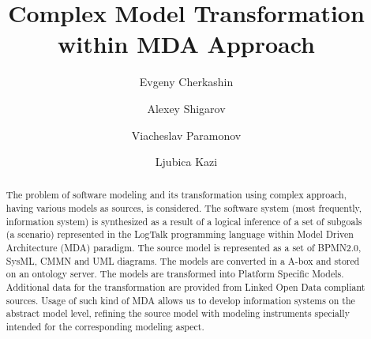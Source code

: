 \documentclass[12pt,a4paper]{llncs}
\begin{document}
\title{Complex Model Transformation within MDA Approach}


\author{Evgeny Cherkashin\and
Alexey Shigarov\and
Viacheslav Paramonov\and
Ljubica Kazi
}



\institute{%
Matrosov Institute for System Dynamics and Control Theory of SB RAS,\\ 134 Lermontov Street, Irkutsk, 664033, Russia\and
National Research Irkutsk State Technical University,\\ 83 Lermontov Street, Irkutsk, 664074, Russia\\
University of Novi Sad, Technical faculty "Mihajlo Pupin",\\ \DJ{}ure \DJ{}akovi\'ca bb, Zrenjanin, 23000, Serbia\and
\email{\{eugeneai,shig,slv\}@icc.ru, ljubica.kazi@gmail.com}}

\maketitle

\begin{abstract} %
The problem of software modeling and its transformation using complex approach, having various models as sources, is considered.  The software system (most frequently, information system) is synthesized as a result of a logical inference of a set of subgoals (a scenario) represented in the LogTalk programming language within Model Driven Architecture (MDA) paradigm.  The source model is represented as a set of BPMN2.0, SysML, CMMN and UML diagrams.  The models are converted in a A-box and stored on an ontology server.  The models are transformed into Platform Specific Models.  Additional data for the transformation are provided from Linked Open Data compliant sources.  Usage of such kind of MDA allows us to develop information systems on the abstract model level, refining the source model with modeling instruments specially intended for the corresponding modeling aspect.

\end{abstract}
\end{document}
